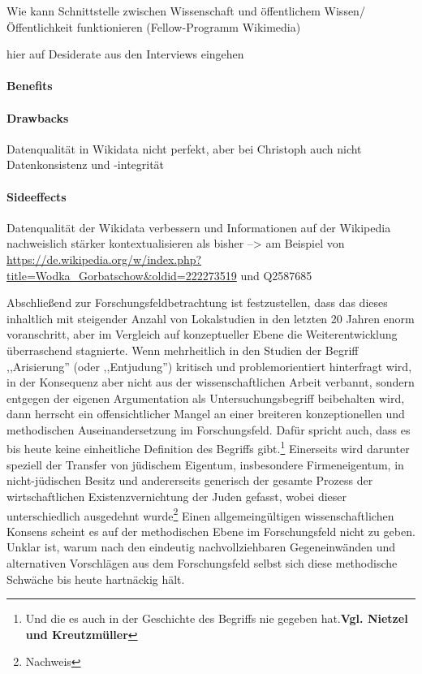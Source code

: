 Wie kann Schnittstelle zwischen Wissenschaft und öffentlichem Wissen/ Öffentlichkeit funktionieren (Fellow-Programm Wikimedia)

hier auf Desiderate aus den Interviews eingehen

\paragraph{Benefits}

\paragraph{Drawbacks}

Datenqualität in Wikidata nicht perfekt, aber bei Christoph auch nicht
Datenkonsistenz und -integrität

\paragraph{Sideeffects}

Datenqualität der Wikidata verbessern und Informationen auf der Wikipedia nachweislich stärker kontextualisieren als bisher
--> am Beispiel von \url{https://de.wikipedia.org/w/index.php?title=Wodka_Gorbatschow&oldid=222273519} und Q2587685

Abschließend zur Forschungsfeldbetrachtung ist festzustellen, dass das dieses inhaltlich mit steigender Anzahl von Lokalstudien in den letzten 20 Jahren enorm voranschritt, aber im Vergleich auf konzeptueller Ebene die Weiterentwicklung überraschend stagnierte. Wenn mehrheitlich in den Studien der Begriff ,,Arisierung'' (oder ,,Entjudung'') kritisch und problemorientiert hinterfragt wird, in der Konsequenz aber nicht aus der wissenschaftlichen Arbeit verbannt, sondern entgegen der eigenen Argumentation als Untersuchungsbegriff beibehalten wird, dann herrscht ein offensichtlicher Mangel an einer breiteren konzeptionellen und methodischen Auseinandersetzung im Forschungsfeld. Dafür spricht auch, dass es bis heute keine einheitliche Definition des Begriffs gibt.\footnote{Und die es auch in der Geschichte des Begriffs nie gegeben hat.\textbf{Vgl. Nietzel und Kreutzmüller}} Einerseits wird darunter speziell der Transfer von jüdischem Eigentum, insbesondere Firmeneigentum, in nicht-jüdischen Besitz und andererseits generisch der gesamte Prozess der wirtschaftlichen Existenzvernichtung der Juden gefasst, wobei dieser unterschiedlich ausgedehnt wurde\footnote{Nachweis} Einen allgemeingültigen wissenschaftlichen Konsens scheint es auf der methodischen Ebene im Forschungsfeld nicht zu geben. Unklar ist, warum nach den eindeutig nachvollziehbaren Gegeneinwänden und alternativen Vorschlägen aus dem Forschungsfeld selbst sich diese methodische Schwäche bis heute hartnäckig hält.


